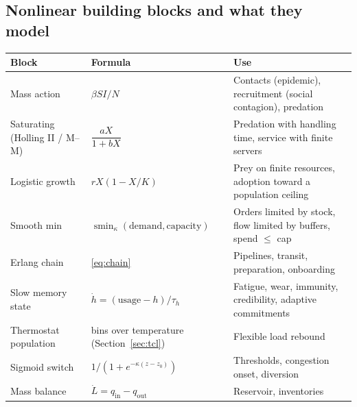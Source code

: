 \documentclass[11pt]{article}
\theoremstyle{plain}
\theoremstyle{definition}
\theoremstyle{remark}
\newcommand{\softmin}{\operatorname{smin}}
\begin{document}
\subsection{Nonlinear building blocks and what they model}
\begin{center}
\small
\begin{tabular}{@{}p{3.6cm}p{5.3cm}p{5.8cm}@{}}
\toprule
Block & Formula & Use \\
\midrule
Mass action & $\beta SI/N$ & Contacts (epidemic), recruitment (social contagion), predation \\
Saturating (Holling II / M--M) & $\dfrac{aX}{1+bX}$ & Predation with handling time, service with finite servers \\
Logistic growth & $rX(1-X/K)$ & Prey on finite resources, adoption toward a population ceiling \\
Smooth min & $\softmin_\kappa(\text{demand},\text{capacity})$ & Orders limited by stock, flow limited by buffers, spend $\le$ cap \\
Erlang chain & \eqref{eq:chain} & Pipelines, transit, preparation, onboarding \\
Slow memory state & $\dot h=(\text{usage}-h)/\tau_h$ & Fatigue, wear, immunity, credibility, adaptive commitments \\
Thermostat population & bins over temperature (Section~\ref{sec:tcl}) & Flexible load rebound \\
Sigmoid switch & $1/(1+e^{-\kappa(z-z_0)})$ & Thresholds, congestion onset, diversion \\
Mass balance & $\dot L=q_{\text{in}}-q_{\text{out}}$ & Reservoir, inventories \\
\bottomrule
\end{tabular}
\end{center}
\end{document}
